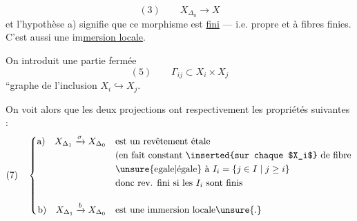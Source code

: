 \[
(3)\qquad X_{\Delta_0}\longrightarrow X
\]
et l'hypothèse a) signifie que ce
morphisme  est \uline{fini} --- i.e. propre
 et à fibres finies. C'est aussi une
im\uline{mersion locale}.

On introduit une partie fermée
\[
(5)\qquad \Gamma_{ij}\subset X_i\times X_j
\]
``graphe de l'inclusion $X_i\hookrightarrow X_j$.

On voit alors que les deux projections
ont respectivement les propriétés suivantes :
\[
(7)\quad\left\{\begin{aligned}
\text{a)}\quad X_{\Delta_1}\xrightarrow{\sigma}X_{\Delta_0}&\quad\text{est un revêtement étale}\\
&\quad\text{(en fait constant \inserted{sur chaque $X_i$} de fibre}\\
&\quad\text{\unsure{egale|égale} à }I_i=\{j\in I\mid j\geq i\}\\
&\quad\text{donc rev. fini si les }I_i\text{ sont finis}\\[1em]
\text{b)}\quad X_{\Delta_1}\xrightarrow{b}X_{\Delta_0}&\quad\text{est une immersion locale\unsure{.}}
\end{aligned}\right.
\]
